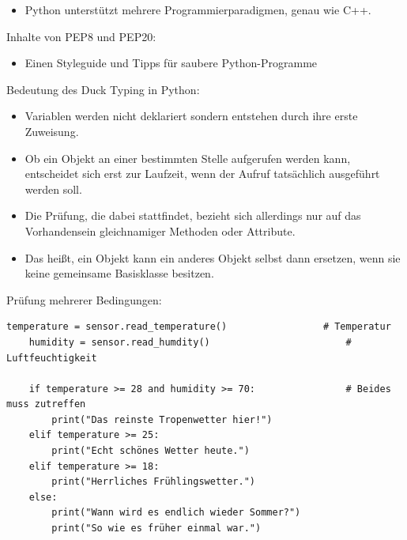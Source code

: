 \begin{itemize}
    \renewcommand{\labelitemi}{$\blacksquare$}
    \item Python unterstützt mehrere Programmierparadigmen, genau wie C++.
\end{itemize}

\teilaufgabe
Inhalte von PEP8 und PEP20:

\begin{itemize}
    \renewcommand{\labelitemi}{$\blacksquare$}
    \item Einen Styleguide und Tipps für saubere Python-Programme
\end{itemize}

\teilaufgabe
Bedeutung des \glqq{}Duck Typing\grqq{} in Python:

\begin{itemize}
    \renewcommand{\labelitemi}{$\blacksquare$}
    \item Variablen werden nicht deklariert sondern entstehen durch ihre erste Zuweisung.
    \item Ob ein Objekt an einer bestimmten Stelle aufgerufen werden kann, entscheidet sich erst zur Laufzeit,
    wenn der Aufruf tatsächlich ausgeführt werden soll.
    \item Die Prüfung, die dabei stattfindet, bezieht sich allerdings nur auf das Vorhandensein
    gleichnamiger Methoden oder Attribute.
    \item Das heißt, ein Objekt kann ein anderes Objekt selbst dann ersetzen,
    wenn sie keine gemeinsame Basisklasse besitzen.
\end{itemize}

\clearpage

\teilaufgabe
Prüfung mehrerer Bedingungen:

\begin{Verbatim}[gobble=4]
    temperature = sensor.read_temperature()                 # Temperatur
    humidity = sensor.read_humdity()                        # Luftfeuchtigkeit

    if temperature >= 28 and humidity >= 70:                # Beides muss zutreffen
        print("Das reinste Tropenwetter hier!")
    elif temperature >= 25:
        print("Echt schönes Wetter heute.")
    elif temperature >= 18:
        print("Herrliches Frühlingswetter.")
    else:
        print("Wann wird es endlich wieder Sommer?")
        print("So wie es früher einmal war.")

\end{Verbatim}

